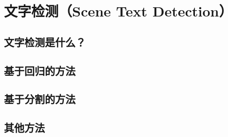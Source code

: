 \chapter{文字检测（Scene Text Detection）}

\section{文字检测是什么？}

\section{基于回归的方法}

\section{基于分割的方法}


\section{其他方法}
